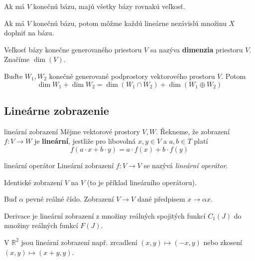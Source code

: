 \begin{dosledok}
Ak má $V$ konečnú bázu, majú všetky bázy rovnakú veľkosť.
\end{dosledok}

\begin{dosledok}
Ak má $V$ konečnú bázu, potom môžme každú lineárne nezávislú množinu $X$ doplniť na bázu.
\end{dosledok}

\begin{definicia}
Veľkosť bázy konečne generovaného priestoru $V$ sa nazýva \textbf{dimenzia} priestoru $V$. Značíme $\dim(V)$.
\end{definicia}

\begin{veta}
Buďte $W_1, W_2$ konečně generované podprostory vektorového
prostoru $V.$ Potom
$$\dim W_1+\dim W_2 = \dim(W_1 \cap W_2)+\dim(W_1 \oplus W_2)$$
\end{veta}

\subsection{Lineárne zobrazenie}

\begin{definiceN}{lineární zobrazení}
Mějme vektorové prostory $V,W$. Řekneme, že zobrazení $f: V \to W$ je \textbf{lineární}, jestliže pro libovolná $x,y \in V$ a $a, b \in T$ platí
$$f(a \cdot x + b \cdot y) = a \cdot f(x) + b \cdot f(y)$$
\end{definiceN}

\begin{definiceN}{lineární operátor}
Lineární zobrazení $f: V \rightarrow V$ se nazývá \emph{lineární operátor}.
\end{definiceN}

\begin{priklady}
\begin{penumerate}
    \item Identické zobrazení $V$ na $V$ (to je příklad lineárního operátoru).
    \item Buď $\alpha$ pevné reálné číslo. Zobrazení $V \to V$ dané předpisem $x \to \alpha x.$
    \item Derivace je lineární zobrazení z množiny reálných spojitých funkcí $C_1(J)$ do množiny reálných funkcí $F(J).$
    \item V $\mathbb{R}^2$ jsou lineární zobrazení např. zrcadlení $(x,y)\mapsto(-x,y)$ nebo zkosení $(x,y)\mapsto(x+y,y)$.
\end{penumerate}
\end{priklady}

